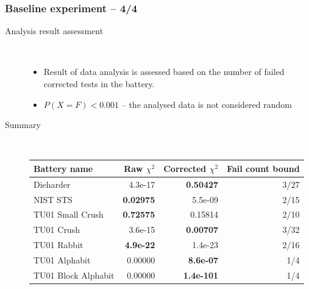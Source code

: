 \documentclass[aspectratio=169]{beamer}
\begin{document}
\begin{frame}
\frametitle{Baseline experiment -- 4/4}

\begin{description}
\item[Analysis result assessment] \hfill \\
\begin{itemize}
\item Result of data analysis is assessed based on the number of failed corrected tests in the battery.
\item $P(X=F) < 0.001$ -- the analysed data is not considered random
\end{itemize}
\item[Summary] \hfill \\
\begin{table}
\begin{nomar}
\centering
\begin{tabular}{l || r | r | r}
\textbf{Battery name} & \textbf{Raw} $\chi^2$ & \textbf{Corrected} $\chi^2$ & \textbf{Fail count bound} \\ \hline \hline
Dieharder            & 4.3e-17          & \textbf{0.50427}  & 3/27 \\ 
NIST STS             & \textbf{0.02975} & 5.5e-09           & 2/15 \\ 
TU01 Small Crush     & \textbf{0.72575} & 0.15814           & 2/10 \\ 
TU01 Crush           & 3.6e-15          & \textbf{0.00707}  & 3/32 \\ 
TU01 Rabbit          & \textbf{4.9e-22} & 1.4e-23           & 2/16 \\ 
TU01 Alphabit        & 0.00000          & \textbf{8.6e-07}  & 1/4 \\ 
TU01 Block Alphabit  & 0.00000          & \textbf{1.4e-101} & 1/4 \\
\end{tabular}
\end{nomar}
\end{table}
\end{description}

\end{frame}
\end{document}
